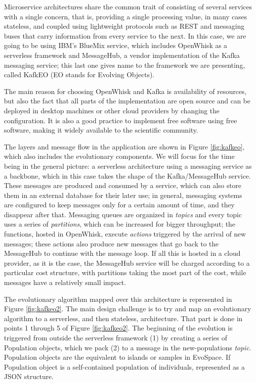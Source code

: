 \documentclass{llncs}
\begin{document}
  Microservice architectures share the common trait of consisting of several services with a single concern, that is, providing a single processing value,
  in many cases stateless, and coupled using lightweight protocols such
  as REST and messaging buses that carry information from every service
  to the next. In this case, we are going to be using IBM's BlueMix
  service, which includes OpenWhisk as a serverless framework and
  MessageHub, a vendor implementation of the Kafka messaging
  service; this last one gives name to the framework we are presenting, called KafkEO (EO stands for Evolving Objects).

  The main reason for choosing OpenWhisk and Kafka is availability of
  resources, but also the fact that all parts of the implementation are open source and can be deployed in desktop machines or other cloud providers by changing the configuration. It is also a good practice to implement free
  software using free software, making it widely available to the
  scientific community.

  The layers and message flow in the application are shown in Figure
  \ref{fig:kafkeo}, which also includes the evolutionary components. We
  will focus for the time being in the general picture: a serverless
  architecture using a messaging service as a backbone, which in this case
  takes the shape of the Kafka/MessageHub service. 
  These messages are produced and
  consumed by a service, which can also store them in an external database
  for their later use; in general, messaging systems are configured to
  keep messages only for a certain amount of time, and they disappear
  after that. Messaging queues are organized in {\em topics} and every
  topic uses a series of {\em partitions}, which can be increased for
  bigger throughput; the
  functions, hosted in OpenWhisk, execute {\em actions} triggered by the
  arrival of new messages; these actions also produce new messages that
  go back to the MessageHub to continue with the message loop. If all
  this is hosted in a cloud provider, as it is the case, the MessageHub
  service will be charged according to a particular cost
  structure, with partitions taking the most part of
  the cost, while messages have a relatively small impact.

  The evolutionary algorithm mapped over this architecture is 
  represented in Figure \ref{fig:kafkeo2}. The main
  design challenge is to try and map an evolutionary algorithm to a
  serverless, and then stateless, architecture. That part is done in
  points 1 through 5 of Figure \ref{fig:kafkeo2}. The beginning of the
  evolution is triggered from outside the serverless framework (1) by
  creating a series of Population objects, which we pack (2) to a message in the
  {\sf new-populations} {\em topic}. Population objects are the equivalent to islands or samples in EvoSpace. If Population object is a self-contained population of individuals, represented as a JSON structure. 
    
\end{document}
